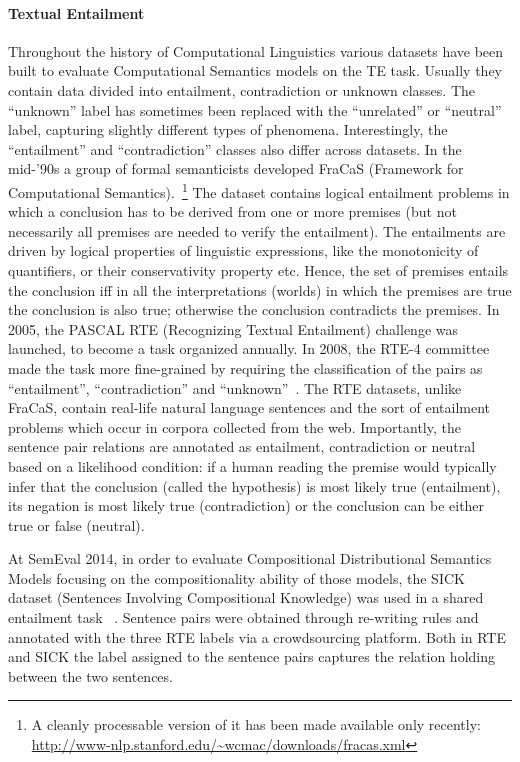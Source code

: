 \documentclass[11pt]{article}
\begin{document}
\paragraph{Textual Entailment}
Throughout the history of Computational Linguistics various datasets have
been built to evaluate Computational Semantics models on the TE task.
Usually they contain data divided into entailment, contradiction or
unknown classes. The ``unknown'' label has sometimes been replaced
with the ``unrelated'' or ``neutral'' label, capturing slightly
different types of phenomena. Interestingly, the ``entailment''
and ``contradiction'' classes also differ across datasets. In the
mid-'90s a group of formal semanticists developed FraCaS (Framework for
Computational Semantics).~\cite{coop:usin96}\footnote{A cleanly
  processable version of it has been made available only recently:
  \url{http://www-nlp.stanford.edu/~wcmac/downloads/fracas.xml}} The
dataset contains logical entailment problems in which a conclusion has
to be derived from one or more premises (but not necessarily all
premises are needed to verify the entailment). The entailments are
driven by logical properties of linguistic expressions, like the
monotonicity of quantifiers, or their conservativity property
etc. Hence, the set of premises entails the conclusion iff in all the
interpretations (worlds) in which the premises are true the conclusion
is also true; otherwise the conclusion contradicts the premises. In
2005, the PASCAL RTE (Recognizing Textual Entailment) challenge was
launched, to become a task organized annually.
In 2008, the RTE-4 committee made the task more
fine-grained by requiring the classification of the pairs as
``entailment'', ``contradiction'' and
``unknown''~\cite{giam:rte08}. The RTE datasets, unlike
FraCaS, contain real-life natural language sentences and the sort of
entailment problems which occur in corpora collected from the web.
Importantly, the sentence pair relations are annotated as entailment,
contradiction or neutral based on a likelihood condition: if
a human reading the premise would typically infer that the conclusion (called the
hypothesis) is most likely true (entailment), its negation is most
likely true (contradiction) or the conclusion can be either true or
false (neutral).

At SemEval 2014, in order to evaluate Compositional Distributional
Semantics Models focusing on the compositionality ability of those
models, the SICK dataset (Sentences Involving Compositional Knowledge)
was used in a shared entailment task ~\cite{mare:sick14}. Sentence pairs were obtained
through re-writing rules and annotated with the three RTE labels via a
crowdsourcing platform. Both in RTE and SICK the label assigned to the
sentence pairs captures the relation holding between the two
sentences. 
\end{document}
